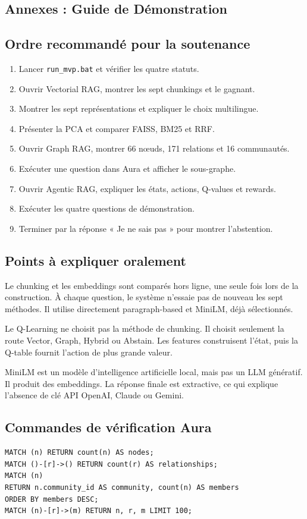 \documentclass[12pt,a4paper,oneside]{report}
\newcommand{\tech}[1]{\texttt{#1}}
\begin{document}
\begin{appendices}
\chapter{Annexes : Guide de Démonstration}
\section{Ordre recommandé pour la soutenance}
\begin{enumerate}
  \item Lancer \tech{run\_mvp.bat} et vérifier les quatre statuts.
  \item Ouvrir Vectorial RAG, montrer les sept chunkings et le gagnant.
  \item Montrer les sept représentations et expliquer le choix multilingue.
  \item Présenter la PCA et comparer FAISS, BM25 et RRF.
  \item Ouvrir Graph RAG, montrer 66 nœuds, 171 relations et 16 communautés.
  \item Exécuter une question dans Aura et afficher le sous-graphe.
  \item Ouvrir Agentic RAG, expliquer les états, actions, Q-values et rewards.
  \item Exécuter les quatre questions de démonstration.
  \item Terminer par la réponse « Je ne sais pas » pour montrer l'abstention.
\end{enumerate}

\section{Points à expliquer oralement}
Le chunking et les embeddings sont comparés hors ligne, une seule fois lors de la construction. À chaque question, le système n'essaie pas de nouveau les sept méthodes. Il utilise directement paragraph-based et MiniLM, déjà sélectionnés.

Le Q-Learning ne choisit pas la méthode de chunking. Il choisit seulement la route Vector, Graph, Hybrid ou Abstain. Les features construisent l'état, puis la Q-table fournit l'action de plus grande valeur.

MiniLM est un modèle d'intelligence artificielle local, mais pas un LLM génératif. Il produit des embeddings. La réponse finale est extractive, ce qui explique l'absence de clé API OpenAI, Claude ou Gemini.

\section{Commandes de vérification Aura}
\begin{lstlisting}[style=code]
MATCH (n) RETURN count(n) AS nodes;
MATCH ()-[r]->() RETURN count(r) AS relationships;
MATCH (n)
RETURN n.community_id AS community, count(n) AS members
ORDER BY members DESC;
MATCH (n)-[r]->(m) RETURN n, r, m LIMIT 100;
\end{lstlisting}

\end{appendices}
\end{document}
